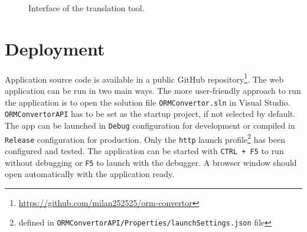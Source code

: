 \begin{figure}[!htp]
  \centering
  \caption{Interface of the translation tool.}
  \label{fig:tool_interface}
\end{figure}


\section{Deployment}
Application source code is available in a public GitHub repository\footnote{\url{https://github.com/milan252525/orm-convertor}}. The web application can be run in two main ways. The more user-friendly approach to run the application is to open the solution file \texttt{ORMConvertor.sln} in Visual Studio. \texttt{ORMConvertorAPI} has to be set as the startup project, if not selected by default. The app can be launched in \texttt{Debug} configuration for development or compiled in \texttt{Release} configuration for production. Only the \texttt{http} launch profile\footnote{defined in \texttt{ORMConvertorAPI/Properties/launchSettings.json} file} has been configured and tested. The application can be started with \texttt{CTRL + F5} to run without debugging or \texttt{F5} to launch with the debugger. A browser window should open automatically with the application ready.


